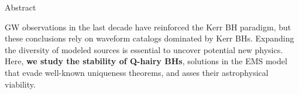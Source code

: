 \begin{block}{Abstract}

\Gls{GW} observations in the last decade have reinforced the Kerr \gls{BH} paradigm, but these conclusions rely on waveform catalogs dominated by Kerr \glspl{BH}. Expanding the diversity of modeled sources is essential to uncover potential new physics. Here, \textbf{we study the stability of Q-hairy \glspl{BH}}, solutions in the \gls{EMS} model that evade well-known uniqueness theorems, and asses their astrophysical viability.

\end{block}
